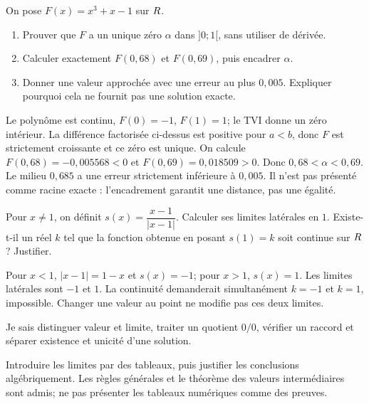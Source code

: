 \label{t11s-c02-p01}
On pose $F(x)=x^3+x-1$ sur $R$.
\begin{enumerate}
\item Prouver que $F$ a un unique zéro $\alpha$ dans $]0;1[$, sans utiliser de dérivée.
\item Calculer exactement $F(0{,}68)$ et $F(0{,}69)$, puis encadrer $\alpha$.
\item Donner une valeur approchée avec une erreur au plus $0{,}005$. Expliquer pourquoi cela ne fournit pas une solution exacte.
\end{enumerate}
\begin{corrige}\label{sol-t11s-c02-p01}
Le polynôme est continu, $F(0)=-1$, $F(1)=1$; le TVI donne un zéro intérieur. La différence factorisée ci-dessus est positive pour $a<b$, donc $F$ est strictement croissante et ce zéro est unique. On calcule $F(0{,}68)=-0{,}005568<0$ et $F(0{,}69)=0{,}018509>0$. Donc $0{,}68<\alpha<0{,}69$. Le milieu $0{,}685$ a une erreur strictement inférieure à $0{,}005$. Il n’est pas présenté comme racine exacte : l’encadrement garantit une distance, pas une égalité.
\end{corrige}
\label{t11s-c02-p02}
Pour $x\ne1$, on définit $s(x)=\dfrac{x-1}{|x-1|}$. Calculer ses limites latérales en $1$. Existe-t-il un réel $k$ tel que la fonction obtenue en posant $s(1)=k$ soit continue sur $R$ ? Justifier.
\begin{corrige}\label{sol-t11s-c02-p02}
Pour $x<1$, $|x-1|=1-x$ et $s(x)=-1$; pour $x>1$, $s(x)=1$. Les limites latérales sont $-1$ et $1$. La continuité demanderait simultanément $k=-1$ et $k=1$, impossible. Changer une valeur au point ne modifie pas ces deux limites.
\end{corrige}

\begin{jemeteste}Je sais distinguer valeur et limite, traiter un quotient $0/0$, vérifier un raccord et séparer existence et unicité d’une solution.\end{jemeteste}
\begin{notepourlaclasse}Introduire les limites par des tableaux, puis justifier les conclusions algébriquement. Les règles générales et le théorème des valeurs intermédiaires sont admis; ne pas présenter les tableaux numériques comme des preuves.\end{notepourlaclasse}
